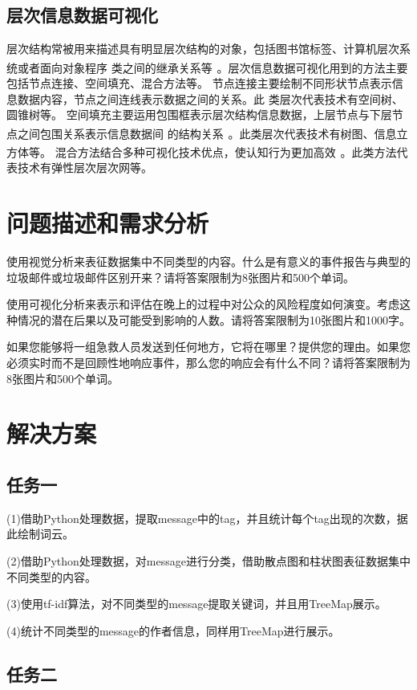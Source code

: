 \documentclass[a4paper]{article}
\begin{document}
\subsection{层次信息数据可视化}
层次结构常被用来描述具有明显层次结构的对象，包括图书馆标签、计算机层次系统或者面向对象程序
类之间的继承关系等\textsuperscript{~\cite{田宇荃2020海绵城市建设前后的可视化效果分析,陶芳2019网络舆论数据可视化技术研究}}。层次信息数据可视化用到的方法主要包括节点连接、空间填充、混合方法等。
节点连接主要绘制不同形状节点表示信息数据内容，节点之间连线表示数据之间的关系。此
类层次代表技术有空间树、圆锥树等。
空间填充主要运用包围框表示层次结构信息数据，上层节点与下层节点之间包围关系表示信息数据间
的结构关系\textsuperscript{~\cite{张甜甜2020一种基于数独分组的拉丁超立方试验设计方法}}。此类层次代表技术有树图、信息立方体等。
混合方法结合多种可视化技术优点，使认知行为更加高效\textsuperscript{~\cite{zhang2021interactive}}。此类方法代表技术有弹性层次层次网等。
\section{问题描述和需求分析}
\label{Data and Task Abstraction}
使用视觉分析来表征数据集中不同类型的内容。什么是有意义的事件报告与典型的垃圾邮件或垃圾邮件区别开来？请将答案限制为8张图片和500个单词。

使用可视化分析来表示和评估在晚上的过程中对公众的风险程度如何演变。考虑这种情况的潜在后果以及可能受到影响的人数。请将答案限制为10张图片和1000字。

如果您能够将一组急救人员发送到任何地方，它将在哪里？提供您的理由。如果您必须实时而不是回顾性地响应事件，那么您的响应会有什么不同？请将答案限制为8张图片和500个单词。

\section{解决方案}
\subsection{任务一}
(1)借助Python处理数据，提取message中的tag，并且统计每个tag出现的次数，据此绘制词云。

(2)借助Python处理数据，对message进行分类，借助散点图和柱状图表征数据集中不同类型的内容。

(3)使用tf-idf算法，对不同类型的message提取关键词，并且用TreeMap展示。

(4)统计不同类型的message的作者信息，同样用TreeMap进行展示。
\subsection{任务二}
\end{document}
